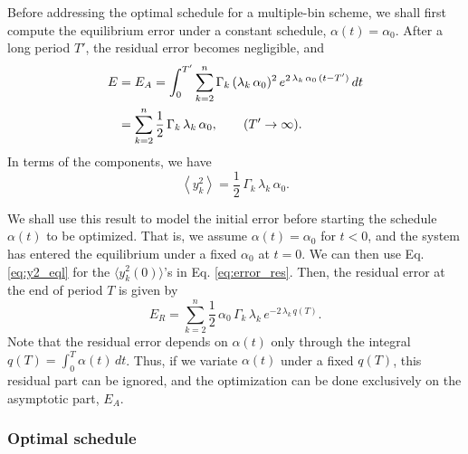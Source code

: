 \documentclass[reprint, floatfix]{revtex4-1}
\newcommand{\Err}{E}
\begin{document}
Before addressing the optimal schedule
for a multiple-bin scheme,
we shall first compute the equilibrium error
under a constant schedule,
$\alpha(t) = \alpha_0$.
%
After a long period $T'$,
the residual error becomes negligible, and
%
\begin{align}
  \Err
  &=
  \Err_A
  =
  \int_0^{T'}
    \sum_{k = 2}^n
      \Gamma_k \, (\lambda_k \, \alpha_0)^2 \,
      e^{ 2 \, \lambda_k \, \alpha_0 \, (t - T') }
    \, dt
  \notag
  \\
  &
  =
  \sum_{ k = 2 }^n
    \frac 1 2 \, \Gamma_k \, \lambda_k \, \alpha_0
  ,
  \qquad
  ( T' \to \infty )
  .
\notag
\end{align}
%
In terms of the components, we have
%
\begin{equation}
  \left\langle
    y_k^2
  \right\rangle
  =
  \frac 1 2 \, \Gamma_k \, \lambda_k \, \alpha_0.
  \label{eq:y2_eql}
\end{equation}
%


We shall use this result to model the initial error
before starting the schedule $\alpha(t)$ to be optimized.
%
That is, we assume
$\alpha(t) = \alpha_0$
for $t < 0$, and
the system has entered the equilibrium
under a fixed $\alpha_0$ at $t = 0$.
%
We can then use Eq. \eqref{eq:y2_eql}
for the $\langle y_k^2(0) \rangle$'s in Eq. \eqref{eq:error_res}.
%
Then,
the residual error at the end of period $T$
is given by
%
\begin{equation}
  \Err_R
  =
  \sum_{k = 2}^n
      \frac 1 2 \, \alpha_0 \, \Gamma_k \, \lambda_k \,
      e^{  - 2 \, \lambda_k \, q(T) }
  .
  \label{eq:error_res1}
\end{equation}
%
Note that the residual error
depends on $\alpha(t)$ only through
the integral $q(T) = \int_0^T \alpha(t) \, dt$.
%
Thus, if we variate $\alpha(t)$ under a fixed $q(T)$,
this residual part can be ignored,
and the optimization can be done exclusively
on the asymptotic part, $\Err_A$.



\subsubsection{\label{sec:optschedule}
Optimal schedule}
\end{document}

